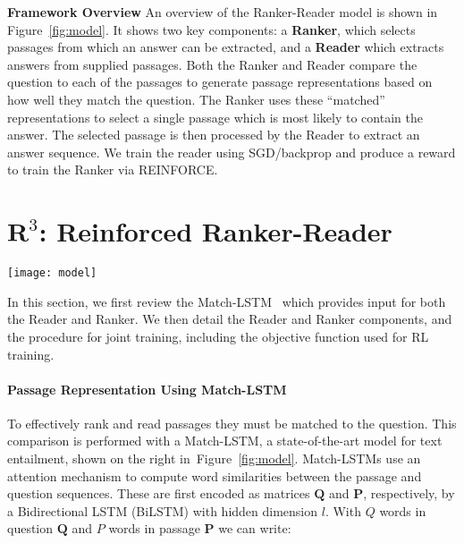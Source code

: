 \documentclass[letterpaper]{article} \usepackage{aaai18}  \usepackage{times}  \usepackage{helvet}  \usepackage{courier}  \usepackage{url}  \usepackage{graphicx}  \usepackage{comment}
\begin{document}
\noindent\textbf{Framework Overview} \quad
An overview of the Ranker-Reader model is shown in Figure~\ref{fig:model}. It shows two key components: a \textbf{Ranker}, which selects passages from which an answer can be extracted, and a \textbf{Reader} which extracts answers from supplied passages.  Both the Ranker and Reader compare the question to each of the passages to generate passage representations based on how well they match the question. The Ranker uses these ``matched'' representations to select a single passage which is most likely to contain the answer.  The selected passage is then processed by the Reader to extract an answer sequence.  We train the reader using SGD/backprop and produce a reward to train the Ranker via REINFORCE. 

\section{$\textbf{R}^{3}$: Reinforced Ranker-Reader}
\label{sec:method}


\begin{figure*}[t]
\centering
\texttt{[image: model]}

\caption{Overview of training our model, comprising a Ranker and a Reader based on Match-LSTM as shown on the right side. The Ranker selects a passage $\tau$ and the Reader predicts the start and end positions of the answer in $\tau$. The reward for the Ranker depends on similarity of the extracted answer with the ground-truth answer $\mathbf{a}^g$. To accelerate Reader convergence,
we also sample several negative passages without ground-truth answer.}
\label{fig:model}
\end{figure*}

In this section, we first review the Match-LSTM~\cite{wang2015learning:NAACL2016} which provides input for both the Reader and Ranker. We then detail the Reader and Ranker components, and the procedure for joint training, including the objective function used for RL training.


\paragraph{Passage Representation Using Match-LSTM}
To effectively rank and read passages they must be matched to the question.  This comparison is performed with a Match-LSTM, a state-of-the-art model for text entailment, shown on the right in~Figure~\ref{fig:model}. Match-LSTMs use an attention mechanism to compute word similarities between the passage and question sequences.  These are first encoded as matrices $\mathbf{Q}$ and $\mathbf{P}$, respectively, by a Bidirectional LSTM (BiLSTM) with hidden dimension $l$.  With $Q$ words in question $\mathbf{Q}$ and $P$ words in passage $\mathbf{P}$ we can write:
\end{document}

